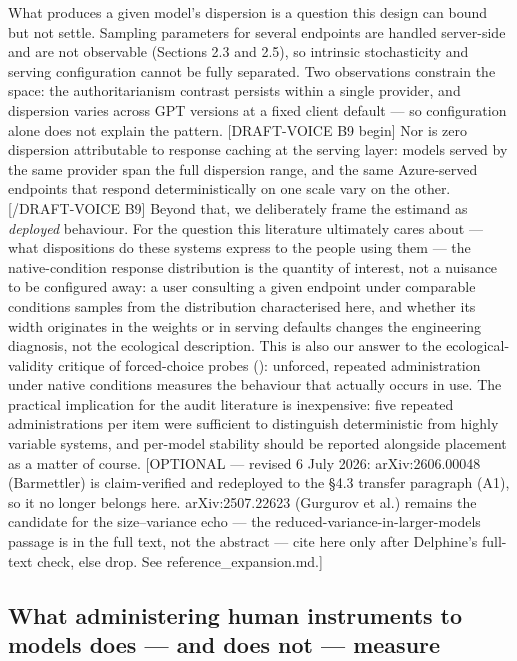 \documentclass[
]{article}
\begin{document}
What produces a given model's dispersion is a question this design can
bound but not settle. Sampling parameters for several endpoints are
handled server-side and are not observable (Sections 2.3 and 2.5), so
intrinsic stochasticity and serving configuration cannot be fully
separated. Two observations constrain the space: the authoritarianism
contrast persists within a single provider, and dispersion varies across
GPT versions at a fixed client default --- so configuration alone does
not explain the pattern. {[}DRAFT-VOICE B9 begin{]} Nor is zero
dispersion attributable to response caching at the serving layer: models
served by the same provider span the full dispersion range, and the same
Azure-served endpoints that respond deterministically on one scale vary
on the other. {[}/DRAFT-VOICE B9{]} Beyond that, we deliberately frame
the estimand as \emph{deployed} behaviour. For the question this
literature ultimately cares about --- what dispositions do these systems
express to the people using them --- the native-condition response
distribution is the quantity of interest, not a nuisance to be
configured away: a user consulting a given endpoint under comparable
conditions samples from the distribution characterised here, and whether
its width originates in the weights or in serving defaults changes the
engineering diagnosis, not the ecological description. This is also our
answer to the ecological-validity critique of forced-choice probes
(): unforced, repeated
administration under native conditions measures the behaviour that
actually occurs in use. The practical implication for the audit
literature is inexpensive: five repeated administrations per item were
sufficient to distinguish deterministic from highly variable systems,
and per-model stability should be reported alongside placement as a
matter of course. {[}OPTIONAL --- revised 6 July 2026: arXiv:2606.00048
(Barmettler) is claim-verified and redeployed to the §4.3 transfer
paragraph (A1), so it no longer belongs here. arXiv:2507.22623 (Gurgurov
et al.) remains the candidate for the size--variance echo --- the
reduced-variance-in-larger-models passage is in the full text, not the
abstract --- cite here only after Delphine's full-text check, else drop.
See reference\_expansion.md.{]}

\subsection{What administering human instruments to models does --- and
does not ---
measure}\label{what-administering-human-instruments-to-models-does-and-does-not-measure}
\end{document}

